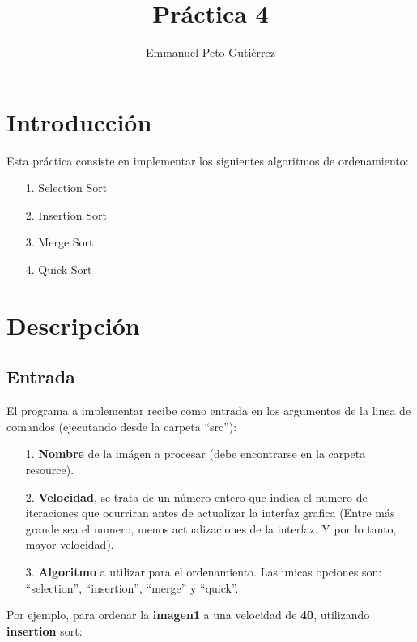 \documentclass{article}
\title{Práctica 4}
\author{Emmanuel Peto Gutiérrez}
\begin{document}
\maketitle

\section{Introducción}

Esta práctica consiste en implementar los siguientes algoritmos de ordenamiento:
\begin{itemize}

\item[1.] Selection Sort
\item[2.] Insertion Sort
\item[3.] Merge Sort
\item[4.] Quick Sort

\end{itemize}

\section{Descripción}

\subsection{Entrada}

El programa a implementar recibe como entrada en los argumentos de la linea
de comandos (ejecutando desde la carpeta ``src''):

\begin{itemize}
\item[1.] \textbf{Nombre} de la imágen a procesar (debe encontrarse en la carpeta resource).

\item[2.] {\bf Velocidad}, se trata de un número entero que indica el numero de iteraciones que ocurriran antes de actualizar la interfaz grafica (Entre más grande sea el numero, menos actualizaciones de la interfaz. Y por lo tanto, mayor velocidad).

\item[3.] {\bf Algoritmo} a utilizar para el ordenamiento. Las unicas opciones son: ``selection'', ``insertion'', ``merge'' y ``quick''.

\end{itemize}

Por ejemplo, para ordenar la {\bf imagen1} a una velocidad de {\bf 40}, utilizando {\bf insertion} sort:
\end{document}
